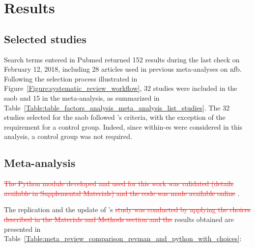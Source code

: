 


\section{Results}

\subsection{Selected studies}

Search terms entered in Pubmed returned 152 results during the last check on February 12, 2018, including 28 
articles used in previous meta-analyses on \gls{nfb}. Following the selection process illustrated 
in Figure~\ref{Figure:systematic_review_workflow}, 32 studies were included in the \gls{saob} and 15 in the meta-analysis, 
as summarized in Table~\ref{Table:table_factors_analysis_meta_analysis_list_studies}. The 32 studies selected for the \gls{saob} 
followed \citeauthor{Cortese2016}'s criteria, with the exception of the requirement for a control group. 
Indeed, since within-\gls{es} were considered in this analysis, a control group was not required.

\subsection{Meta-analysis}

\textcolor{red}{\sout{The Python module developed and used for this work was validated (details available in Supplemental Materials) 
and the code was made available online}} \citep{Bussalb2018}.

The replication and the update of \citeauthor{Cortese2016}'s \textcolor{red}{\sout{study was conducted by applying the choices described 
in the Materials and Methods section and the}} results obtained are presented 
in Table~\ref{Table:meta_review_comparison_revman_and_python_with_choices}:

